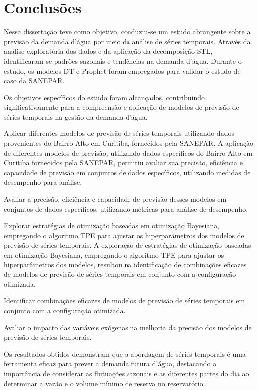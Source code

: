 \section{Conclus\~oes} \label{sec:conclusoes}

Nessa dissertação teve como objetivo, conduziu-se um estudo abrangente sobre a previsão da demanda d'água por meio da análise de séries temporais. Através da análise exploratória dos dados e da aplicação da decomposição STL, identificaram-se padrões sazonais e tendências na demanda d'água. Durante o estudo, os modelos DT e Prophet foram empregados para validar o estudo de caso da SANEPAR.

Os objetivos específicos do estudo foram alcançados, contribuindo significativamente para a compreensão e aplicação de modelos de previsão de séries temporais na gestão da demanda d'água.

Aplicar diferentes modelos de previsão de séries temporais utilizando dados provenientes do Bairro Alto em Curitiba, fornecidos pela SANEPAR.
A aplicação de diferentes modelos de previsão, utilizando dados específicos do Bairro Alto em Curitiba fornecidos pela SANEPAR, permitiu avaliar sua precisão, eficiência e capacidade de previsão em conjuntos de dados específicos, utilizando medidas de desempenho para análise.

Avaliar a precisão, eficiência e capacidade de previsão desses modelos em conjuntos de dados específicos, utilizando métricas para análise de desempenho.

Explorar estratégias de otimização baseadas em otimização Bayesiana, empregando o algoritmo TPE para ajustar os hiperparâmetros dos modelos de previsão de séries temporais.
A exploração de estratégias de otimização baseadas em otimização Bayesiana, empregando o algoritmo TPE para ajustar os hiperparâmetros dos modelos, resultou na identificação de combinações eficazes de modelos de previsão de séries temporais em conjunto com a configuração otimizada.

Identificar combinações eficazes de modelos de previsão de séries temporais em conjunto com a configuração otimizada. 

Avaliar o impacto das variáveis exógenas na melhoria da precisão dos modelos de previsão de séries temporais.

Os resultados obtidos demonstram que a abordagem de séries temporais é uma ferramenta eficaz para prever a demanda futura d'água, destacando a importância de considerar as flutuações sazonais e as diferentes partes do dia ao determinar a vazão e o volume mínimo de reserva no reservatório.

